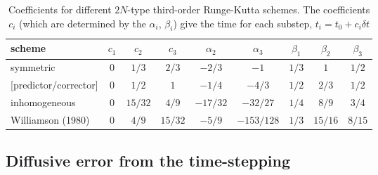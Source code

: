 \documentclass[\mydriver,12pt,twoside,notitlepage,a4paper]{article}
\begin{document}
\begin{table}[htb]
  \centering
  \caption{
    Coefficients for different $2N$-type third-order Runge-Kutta
    schemes.
    The coefficients $c_i$ (which are determined by the $\alpha_i$,
    $\beta_i$) give the time for each substep,
    $t_i = t_0 + c_i \delta t$
    }\label{T-2N-RK3}
  \vspace{12pt}
  \begin{tabular}{l@{\quad}ccc@{\quad}cc@{\quad}ccc}
    \toprule
    scheme            & $c_1$
                            & $c_2$
                                    & $c_3$
                                              & $\alpha_2$
                                                         & $\alpha_3$
                                                                    & $\beta_1$
                                                                            &$\beta_2$
                                                                                    & $\beta_3$\\
    \midrule
    symmetric         & $0$ & $1/3$ & $2/3$   &  $-2/3$  &   $-1$   & $1/3$ &  $1$  & $1/2$ \\
    {}[predictor/corrector]
                      & $0$ & $1/2$ & $1$     &  $-1/4$  &  $-4/3$  & $1/2$ & $2/3$ & $1/2$ \\
    inhomogeneous     & $0$ & $15/32$ & $4/9$ & $-17/32$ & $-32/27$ & $1/4$ & $8/9$ & $3/4$ \\
    Williamson (1980) & $0$ & $4/9$ & $15/32$ &  $-5/9$  &$-153/128$& $1/3$ &$15/16$& $8/15$\\
    \bottomrule
  \end{tabular}
\end{table}

\subsection{Diffusive error from the time-stepping}
\end{document}
